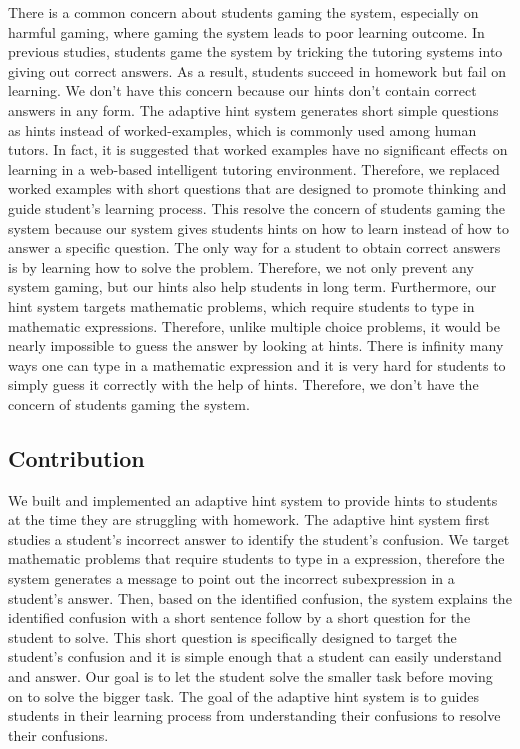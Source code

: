 \documentclass{llncs}
\begin{document}
There is a common concern about students gaming the system, especially on harmful gaming, where gaming the system leads to poor learning outcome\cite{Baker2004}\cite{Baker2005}. In previous studies, students game the system by tricking the tutoring systems into giving out correct answers\cite{Baker2004Off-task}. As a result, students succeed in homework but fail on learning. We don't have this concern because our hints don't contain correct answers in any form. The adaptive hint system generates short simple questions as hints instead of worked-examples, which is commonly used among human tutors\cite{Atkinson2000}. In fact, it is suggested that worked examples have no significant effects on learning in a web-based intelligent tutoring environment\cite{McLaren2006}. Therefore, we replaced worked examples with short questions that are designed to promote thinking and guide student's learning process. This resolve the concern of students gaming the system because our system gives students hints on how to learn instead of how to answer a specific question. The only way for a student to obtain correct answers is by learning how to solve the problem. Therefore, we not only prevent any system gaming, but our hints also help students in long term. Furthermore, our hint system targets mathematic problems, which require students to type in mathematic expressions. Therefore, unlike multiple choice problems, it would be nearly impossible to guess the answer by looking at hints. There is infinity many ways one can type in a mathematic expression and it is very hard for students to simply guess it correctly with the help of hints. Therefore, we don't have the concern of students gaming the system.

\subsection*{Contribution}
We built and implemented an adaptive hint system to provide hints to students at the time they are struggling with homework. The adaptive hint system first studies a student's incorrect answer to identify the student's confusion. We target mathematic problems that require students to type in a expression, therefore the system generates a message to point out the incorrect subexpression in a student's answer. Then, based on the identified confusion, the system explains the identified confusion with a short sentence follow by a short question for the student to solve. This short question is specifically designed to target the student's confusion and it is simple enough that a student can easily understand and answer. Our goal is to let the student solve the smaller task before moving on to solve the bigger task. The goal of the adaptive hint system is to guides students in their learning process from understanding their confusions to resolve their confusions.
\end{document}

